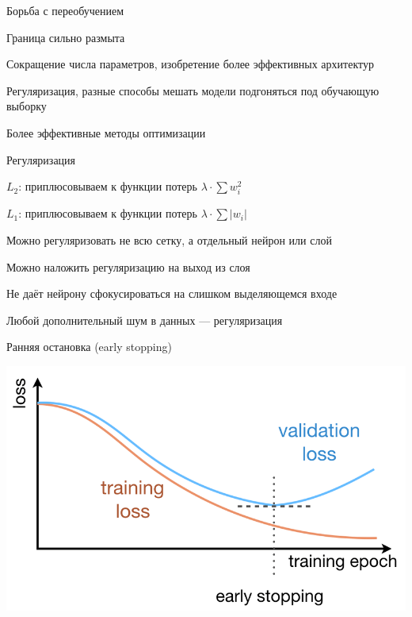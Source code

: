 \documentclass[notes,12pt, aspectratio=169]{beamer}
\newenvironment{wideitemize}{\itemize\addtolength{\itemsep}{10pt}}{\enditemize}
\begin{document}
\begin{frame}{Борьба с переобучением}
	\begin{wideitemize}
		\item Граница сильно размыта
		\item Сокращение числа параметров, изобретение более эффективных архитектур
		\item Регуляризация, разные способы мешать модели подгоняться под обучающую выборку
		\item Более эффективные методы оптимизации
	\end{wideitemize}
\end{frame}


\begin{frame}{Регуляризация}
\begin{wideitemize}
	\item $L_2$: приплюсовываем к функции потерь $\lambda \cdot \sum w_i^2$
	
	\item $L_1$: приплюсовываем к функции потерь $\lambda \cdot \sum |w_i|$
	
	\item Можно регуляризовать не всю сетку, а отдельный нейрон или слой
	
	\item Можно наложить регуляризацию на выход из слоя
	
	\item Не даёт нейрону сфокусироваться на слишком выделяющемся входе	
	
	\item Любой дополнительный шум в данных — регуляризация
\end{wideitemize}
\end{frame}


\begin{frame}{Ранняя остановка (early stopping)}
\begin{center}
	\includegraphics[width=.95\linewidth]{early_stopping.png}
\end{center}
\end{frame}
\end{document}
